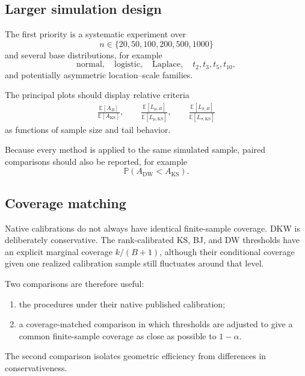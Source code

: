 \documentclass[11pt]{article}
\newcommand{\Pp}{\mathbb{P}}
\newcommand{\Ee}{\mathbb{E}}
\begin{document}
\subsection{Larger simulation design}

The first priority is a systematic experiment over
\[
    n\in
    \{20,50,100,200,500,1000\}
\]
and several base distributions, for example
\[
    \text{normal},
    \quad
    \text{logistic},
    \quad
    \text{Laplace},
    \quad
    t_2,t_3,t_5,t_{10},
\]
and potentially asymmetric location--scale families.

The principal plots should display relative criteria
\begin{align}
    \frac{
        \Ee[A_B]
    }{
        \Ee[A_{\mathrm{KS}}]
    },
    \qquad
    \frac{
        \Ee[L_{\mu,B}]
    }{
        \Ee[L_{\mu,\mathrm{KS}}]
    },
    \qquad
    \frac{
        \Ee[L_{\sigma,B}]
    }{
        \Ee[L_{\sigma,\mathrm{KS}}]
    }
\end{align}
as functions of sample size and tail behavior.

Because every method is applied to the same simulated sample, paired
comparisons should also be reported, for example
\[
    \Pp
    \left(
        A_{\mathrm{DW}}
        <
        A_{\mathrm{KS}}
    \right).
\]


\subsection{Coverage matching}

Native calibrations do not always have identical finite-sample
coverage.  DKW is deliberately conservative.  The rank-calibrated KS,
BJ, and DW thresholds have an explicit marginal coverage
$k/(B+1)$, although their conditional coverage given one realized
calibration sample still fluctuates around that level.

Two comparisons are therefore useful:

\begin{enumerate}[label=(\roman*)]
    \item
    the procedures under their native published calibration;

    \item
    a coverage-matched comparison in which thresholds are adjusted to
    give a common finite-sample coverage as close as possible to
    $1-\alpha$.
\end{enumerate}

The second comparison isolates geometric efficiency from differences in
conservativeness.
\end{document}
